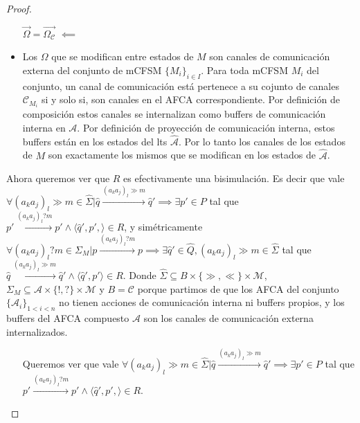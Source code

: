 \begin{proof}
\begin{itemize}
    \item[{$\overrightarrow{\Omega} = \overrightarrow{\Omega_\mathcal{C}}$} $\impliedby$]
    \item Los $\Omega$ que se modifican entre estados de $M$ son canales de comunicación externa del conjunto de mCFSM $\{M_i\}_{i \in I}$. Para toda mCFSM $M_i$ del conjunto, un canal de comunicación está pertenece a su cojunto de canales $\mathcal{C}_{M_i}$ si y solo si, son canales en el AFCA correspondiente. Por definición de composición estos canales se internalizan como buffers de comunicación interna en $\mathcal{A}$. Por definición de proyección de comunicación interna, estos buffers están en los estados del lts $\hat{\mathcal{A}}$. Por lo tanto los canales de los estados de $M$ son exactamente los mismos que se modifican en los estados de $\hat{\mathcal{A}}$.
\end{itemize}

Ahora queremos ver que $R$ es efectivamente una bisimulación. Es decir que vale $\forall (a_ka_j)_l \gg m \in \hat{\Sigma} | \hat{q} \xrightarrow{(a_ka_j)_l \gg m} \hat{q}' \implies \exists p' \in P$ tal que $p' \xrightarrow{(a_ka_j)_l?m} p' \land \langle \hat{q}', p', \rangle \in R$, y simétricamente $\forall (a_ka_j)_l?m \in \Sigma_M | p \xrightarrow{(a_ka_j)_l?m} p \implies \exists \hat{q}' \in \hat{Q}, (a_ka_j)_l \gg m \in \hat{\Sigma}$ tal que $\hat{q} \xrightarrow{(a_ka_j)_l \gg m} \hat{q}' \land \langle \hat{q}', p'\rangle \in R$. Donde $\hat{\Sigma} \subseteq B \times \{\gg,\ll\} \times \mathcal{M}$, $\Sigma_M \subseteq \mathcal{A} \times \{!,?\} \times \mathcal{M}$ y $B = \mathcal{C}$ porque partimos de que los AFCA del conjunto $\{\mathcal{A}_i\}_{1 < i < n}$ no tienen acciones de comunicación interna ni buffers propios, y los buffers del AFCA compuesto $\mathcal{A}$ son los canales de comunicación externa internalizados.

\begin{itemize}
    \item[] Queremos ver que vale $\forall (a_ka_j)_l \gg m \in \hat{\Sigma} | \hat{q} \xrightarrow{(a_ka_j)_l \gg m} \hat{q}' \implies \exists p' \in P$ tal que $p' \xrightarrow{(a_ka_j)_l?m} p' \land \langle \hat{q}', p', \rangle \in R$. 
 

\end{itemize}
\end{proof}
